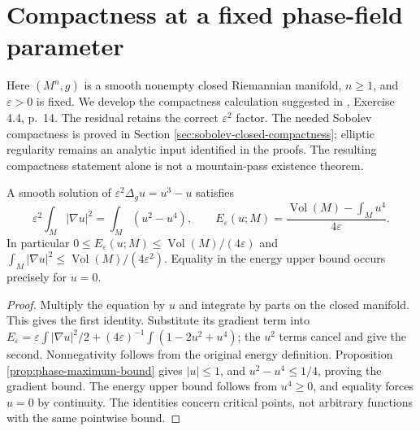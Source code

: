 \chapter{Compactness at a fixed phase-field parameter}\label{sec:phase-fixed-parameter}
Here $(M^n,g)$ is a smooth nonempty closed Riemannian manifold, $n\geq1$, and $\varepsilon>0$ is fixed. We develop the compactness calculation suggested in \cite{ChAC}, Exercise 4.4, p.~14. The residual retains the correct $\varepsilon^2$ factor. The needed Sobolev compactness is proved in Section \ref{sec:sobolev-closed-compactness}; elliptic regularity remains an analytic input identified in the proofs. The resulting compactness statement alone is not a mountain-pass existence theorem.

\begin{proposition}\label{prop:phase-critical-energy-identity}
A smooth solution of $\varepsilon^2\Delta_g u=u^3-u$ satisfies
\[
 \varepsilon^2\int_M|\nabla u|^2=\int_M(u^2-u^4),\qquad
 E_\varepsilon(u;M)=\frac{\operatorname{Vol}(M)-\int_Mu^4}{4\varepsilon}.
\]
In particular $0\leq E_\varepsilon(u;M)\leq\operatorname{Vol}(M)/(4\varepsilon)$ and
$\int_M|\nabla u|^2\leq\operatorname{Vol}(M)/(4\varepsilon^2)$.
Equality in the energy upper bound occurs precisely for $u=0$.
\end{proposition}
\begin{proof}
Multiply the equation by $u$ and integrate by parts on the closed manifold. This gives the first identity. Substitute its gradient term into
$E_\varepsilon=\varepsilon\int|\nabla u|^2/2+(4\varepsilon)^{-1}\int(1-2u^2+u^4)$; the $u^2$ terms cancel and give the second. Nonnegativity follows from the original energy definition. Proposition \ref{prop:phase-maximum-bound} gives $|u|\leq1$, and $u^2-u^4\leq1/4$, proving the gradient bound. The energy upper bound follows from $u^4\geq0$, and equality forces $u=0$ by continuity. The identities concern critical points, not arbitrary functions with the same pointwise bound.
\end{proof}


